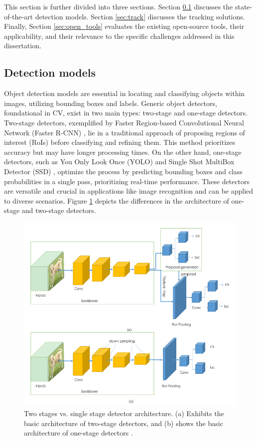 This section is further divided into three sections. Section \ref{sec:detect} discusses the state-of-the-art detection models. Section \ref{sec:track} discusses the tracking solutions. Finally, Section \ref{sec:open_tools} evaluates the existing open-source tools, their applicability, and their relevance to the specific challenges addressed in this dissertation.

\subsection{Detection models}\label{sec:detect}

Object detection models are essential in locating and classifying objects within images, utilizing bounding boxes and labels. Generic object detectors, foundational in CV, exist in two main types: two-stage and one-stage detectors. Two-stage detectors, exemplified by Faster Region-based Convolutional Neural Network (Faster R-CNN) \cite{FasterRCNN}, lie in a traditional approach of proposing regions of interest (RoIs) before classifying and refining them. This method prioritizes accuracy but may have longer processing times. On the other hand, one-stage detectors, such as You Only Look Once (YOLO) \cite{YOLO} and Single Shot MultiBox Detector (SSD) \cite{SSD}, optimize the process by predicting bounding boxes and class probabilities in a single pass, prioritizing real-time performance. These detectors are versatile and crucial in applications like image recognition and can be applied to diverse scenarios. Figure \ref{fig:1vs2} depicts the differences in the architecture of one-stage and two-stage detectors.

\begin{figure}[H]
    \centering
    \includegraphics[width=0.6\linewidth]{figures/single vs two.png}
    \caption[Two stages vs. single stage detector architecture]{Two stages vs. single stage detector architecture. (a) Exhibits the basic architecture of two-stage detectors, and (b) shows the basic architecture of one-stage detectors \cite{1vs2}.}
    \label{fig:1vs2}
\end{figure}

